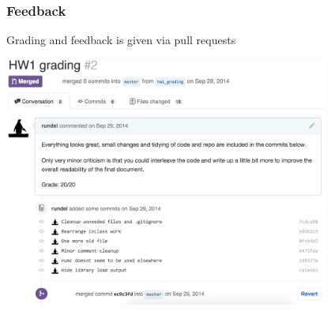 \documentclass[12pt]{beamer}
\begin{document}
\begin{frame}
\frametitle{Feedback}

\vspace{-7mm}

Grading and feedback is given via pull requests

\begin{center}
\includegraphics[width=0.8\textwidth]{imgs/github_pull_request.png}
\end{center}

\end{frame}
\end{document}
